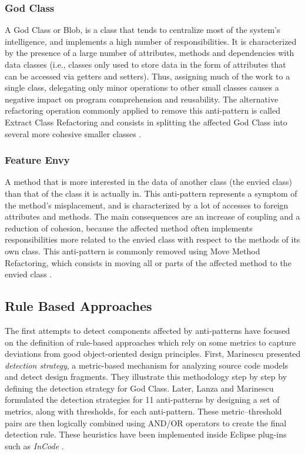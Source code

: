 \subsubsection{God Class}
A God Class or Blob, is a class that tends to centralize most of the system's intelligence, and implements a high number of responsibilities.
It is characterized by the presence of a large number of attributes, methods and dependencies with data classes (i.e., classes only used to store data in the form of attributes that can be accessed via getters and setters). Thus, assigning much of the work to a single class, delegating only minor operations to other small classes causes a negative impact on program comprehension \cite{abbes2011empirical} and reusability. The alternative refactoring operation commonly applied to remove this anti-pattern is called Extract Class Refactoring and consists in splitting the affected God Class into several more cohesive smaller classes \cite{Fowler1999}.

\subsubsection{Feature Envy}
A method that is more interested in the data of another class (the envied class) than that of the class it is actually in. This anti-pattern represents a symptom of the method's misplacement, and is characterized by a lot of accesses to foreign attributes and methods. The main consequences are an increase of coupling and a reduction of cohesion, because the affected method often implements responsibilities more related to the envied class with respect to the methods of its own class. This anti-pattern is commonly removed using Move Method Refactoring, which consists in moving all or parts of the affected method to the envied class \cite{Fowler1999}.

\subsection{Rule Based Approaches}
The first attempts to detect components affected by anti-patterns have focused on the definition of rule-based approaches which rely on some metrics to capture deviations from good object-oriented design principles.
First, Marinescu \cite{marinescu2004detection} presented \textit{detection strategy}, a metric-based mechanism for analyzing source code models and detect design fragments. They illustrate this methodology step by step by defining the detection strategy for God Class. Later, Lanza and Marinescu \cite{lanza2007object} formulated the detection strategies for 11 anti-patterns by designing a set of metrics, along with thresholds, for each anti-pattern. These metric--threshold pairs are then logically combined using AND/OR operators to create the final detection rule. These heuristics have been implemented inside Eclipse plug-ins such as \textit{InCode} \cite{marinescu2010incode}.


